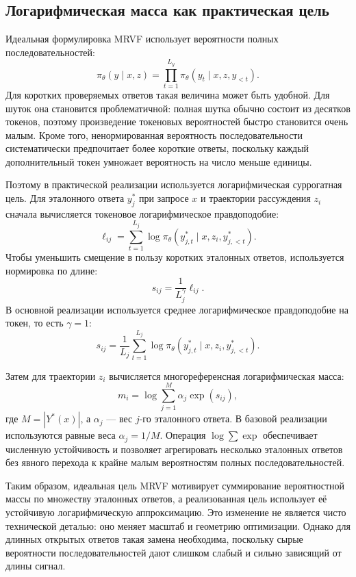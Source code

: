 \subsection{Логарифмическая масса как практическая цель}

Идеальная формулировка MRVF использует вероятности полных последовательностей:
\[
    \pi_{\theta}(y\mid x,z)
    =
    \prod_{t=1}^{L_y}
    \pi_{\theta}(y_t\mid x,z,y_{<t}).
\]
Для коротких проверяемых ответов такая величина может быть удобной. Для шуток она становится проблематичной: полная шутка обычно состоит из десятков токенов, поэтому произведение токеновых вероятностей быстро становится очень малым. Кроме того, ненормированная вероятность последовательности систематически предпочитает более короткие ответы, поскольку каждый дополнительный токен умножает вероятность на число меньше единицы.

Поэтому в практической реализации используется логарифмическая суррогатная цель. Для эталонного ответа \(y_j^{*}\) при запросе \(x\) и траектории рассуждения \(z_i\) сначала вычисляется токеновое логарифмическое правдоподобие:
\[
    \ell_{ij}
    =
    \sum_{t=1}^{L_j}
    \log
    \pi_{\theta}
    \left(
    y_{j,t}^{*}
    \mid
    x,z_i,y_{j,<t}^{*}
    \right).
\]
Чтобы уменьшить смещение в пользу коротких эталонных ответов, используется нормировка по длине:
\[
    s_{ij}
    =
    \frac{1}{L_j^{\gamma}}
    \ell_{ij}.
\]
В основной реализации используется среднее логарифмическое правдоподобие на токен, то есть \(\gamma=1\):
\[
    s_{ij}
    =
    \frac{1}{L_j}
    \sum_{t=1}^{L_j}
    \log
    \pi_{\theta}
    \left(
    y_{j,t}^{*}
    \mid
    x,z_i,y_{j,<t}^{*}
    \right).
\]

Затем для траектории \(z_i\) вычисляется многореференсная логарифмическая масса:
\[
    m_i
    =
    \log
    \sum_{j=1}^{M}
    \alpha_j
    \exp(s_{ij}),
\]
где \(M=|Y^{*}(x)|\), а \(\alpha_j\) --- вес \(j\)-го эталонного ответа. В базовой реализации используются равные веса \(\alpha_j=1/M\). Операция \(\log\sum\exp\) обеспечивает численную устойчивость и позволяет агрегировать несколько эталонных ответов без явного перехода к крайне малым вероятностям полных последовательностей.

Таким образом, идеальная цель MRVF мотивирует суммирование вероятностной массы по множеству эталонных ответов, а реализованная цель использует её устойчивую логарифмическую аппроксимацию. Это изменение не является чисто технической деталью: оно меняет масштаб и геометрию оптимизации. Однако для длинных открытых ответов такая замена необходима, поскольку сырые вероятности последовательностей дают слишком слабый и сильно зависящий от длины сигнал.

